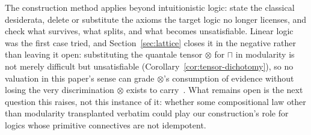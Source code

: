 The construction method applies beyond intuitionistic logic:
state the classical desiderata,
delete or substitute the axioms the target logic no longer licenses,
and check what survives, what splits, and what becomes unsatisfiable.
Linear logic was the first case tried, and Section~\ref{sec:lattice}
closes it in the negative rather than leaving it open: substituting
the quantale tensor $\otimes$ for $\sqcap$ in modularity is not
merely difficult but unsatisfiable
(Corollary~\ref{cor:tensor-dichotomy}), so no valuation in this
paper's sense can grade $\otimes$'s consumption of evidence without
losing the very discrimination $\otimes$ exists to
carry~\cite{danos-ehrhard2011}. What remains open is the next
question this raises, not this instance of it: whether some
compositional law other than modularity transplanted verbatim could
play our construction's role for logics whose primitive connectives
are not idempotent.





